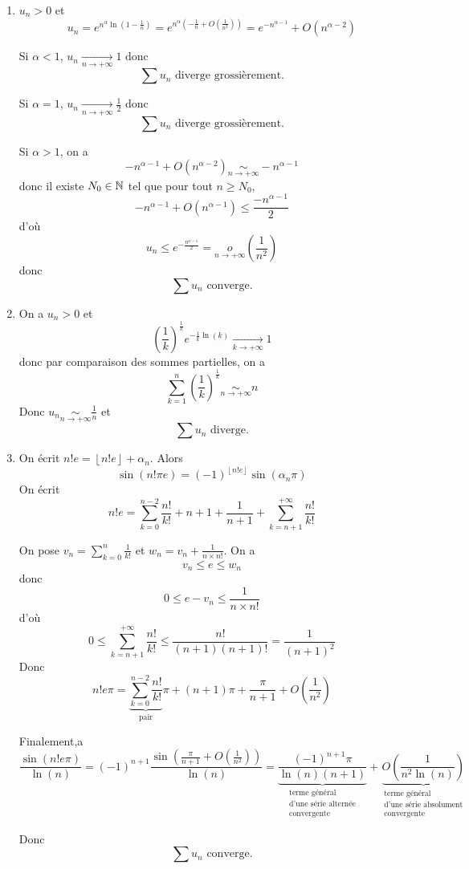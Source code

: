 \begin{solution}
	\phantom{}
	\begin{enumerate}
		\item $u_{n}>0$ et 
		$$u_{n}=e^{n^{\alpha}\ln\left(1-\frac{1}{n}\right)}=e^{n^{\alpha}\left(-\frac{1}{n}+O\left(\frac{1}{n^{2}}\right)\right)}=e^{-n^{\alpha-1}}+O\left(n^{\alpha-2}\right)$$

		Si $\alpha<1$, $u_{n}\xrightarrow[n\to+\infty]{}1$ donc 
		$$\boxed{\sum u_{n}\text{ diverge grossièrement.}}$$

		Si $\alpha=1$, $u_{n}\xrightarrow[n\to+\infty]{}\frac{1}{2}$ donc 
		$$\boxed{\sum u_{n}\text{ diverge grossièrement.}}$$

		Si $\alpha>1$, on a 
		$$-n^{\alpha-1}+O\left(n^{\alpha-2}\right)\underset{n\to+\infty}{\sim}-n^{\alpha-1}$$
		donc il existe $N_{0}\in\mathbb{N}$ tel que pour tout $n\geqslant N_{0}$,
		$$-n^{\alpha-1}+O\left(n^{\alpha-1}\right)\leqslant\frac{-n^{\alpha-1}}{2}$$
		d'où 
		$$u_{n}\leqslant e^{-\frac{n^{\alpha-1}}{2}}=\underset{n\to+\infty}{o}\left(\frac{1}{n^{2}}\right)$$
		donc 
		$$\boxed{\sum u_{n}\text{ converge.}}$$

		\item On a $u_{n}>0$ et 
		$$\left(\frac{1}{k}\right)^{\frac{1}{k}}e^{-\frac{1}{k}\ln(k)}\xrightarrow[k\to+\infty]{}1$$
		donc par comparaison des sommes partielles, on a 
		$$\sum_{k=1}^{n}\left(\frac{1}{k}\right)^{\frac{1}{k}}\underset{n\to+\infty}{\sim}n$$
		Donc $u_{n}\underset{n\to+\infty}{\sim}\frac{1}{n}$ et 
		$$\boxed{\sum u_{n}\text{ diverge.}}$$

		\item On écrit $n!e=\left\lfloor n!e\right\rfloor+\alpha_{n}$.
		Alors 
		$$\sin(n!\pi e)=(-1)^{\left\lfloor n!e\right\rfloor}\sin(\alpha_{n}\pi)$$
		On écrit 
		$$n!e=\sum_{k=0}^{n-2}\frac{n!}{k!}+n+1+\frac{1}{n+1}+\sum_{k=n+1}^{+\infty}\frac{n!}{k!}$$

		On pose $v_{n}=\sum_{k=0}^{n}\frac{1}{k!}$ et $w_{n}=v_{n}+\frac{1}{n\times n!}$. On a 
		$$v_{n}\leqslant e\leqslant w_{n}$$
		donc 
		$$0\leqslant e-v_{n}\leqslant\frac{1}{n\times n!}$$
		d'où
		$$0\leqslant \sum_{k=n+1}^{+\infty}\frac{n!}{k!}\leqslant\frac{n!}{(n+1)(n+1)!}=\frac{1}{(n+1)^{2}}$$
		Donc 
		$$n!e\pi = \underbrace{\sum_{k=0}^{n-2}\frac{n!}{k!}}_{\text{pair}}\pi+(n+1)\pi+\frac{\pi}{n+1}+O\left(\frac{1}{n^{2}}\right)$$

		Finalement,a
		$$\frac{\sin(n!e\pi)}{\ln(n)}=(-1)^{n+1}\frac{\sin\left(\frac{\pi}{n+1}+O\left(\frac{1}{n^{2}}\right)\right)}{\ln(n)}=\underbrace{\frac{(-1)^{n+1}\pi}{\ln(n)(n+1)}}_{\substack{\text{terme général}\\\text{d'une série alternée}\\\text{convergente}}}+\underbrace{O\left(\frac{1}{n^{2}\ln(n)}\right)}_{\substack{\text{terme général}\\\text{d'une série absolument}\\\text{convergente}}}$$

		Donc 
		$$\boxed{\sum u_{n}\text{ converge.}}$$
	\end{enumerate}
\end{solution}

